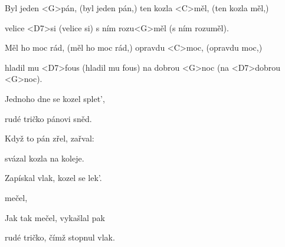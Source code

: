 

\zs
Byl jeden <G>pán, (byl jeden pán,) ten kozla <C>měl, (ten kozla měl,)

velice <D7>si (velice si) s ním rozu<G>měl (s ním rozuměl).

Měl ho moc rád, (měl ho moc rád,) opravdu <C>moc, (opravdu moc,)

hladil mu <D7>fous (hladil mu fous) na dobrou <G>noc (na <D7>dobrou <G>noc).
\ks

\zs
Jednoho dne se kozel splet',

rudé tričko pánovi sněd.

Když to pán zřel, zařval: 

svázal kozla na koleje.
\ks

\zs
Zapískal vlak, kozel se lek'.

 mečel, 

Jak tak mečel, vykašlal pak

rudé tričko, čímž stopnul vlak.
\ks

\kp
